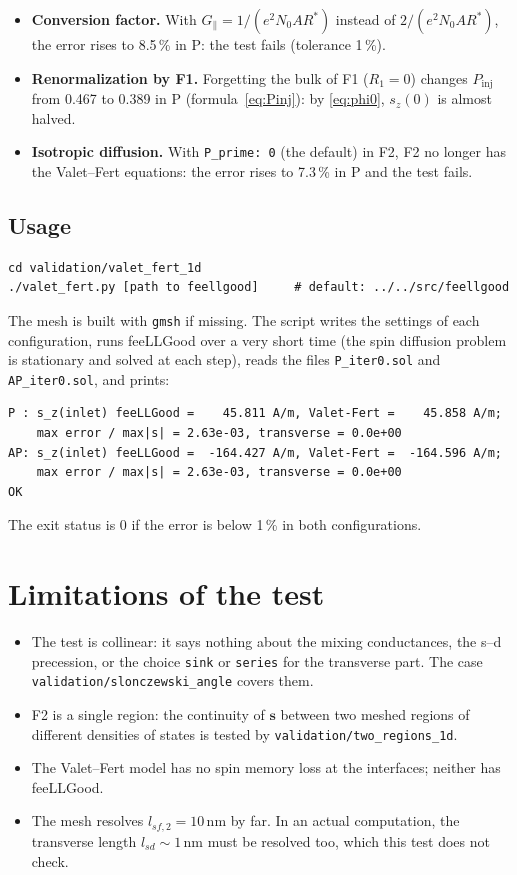 \documentclass[11pt,a4paper]{article}
\newcommand{\vs}{\bm{s}}
\begin{document}
\begin{itemize}
  \item \textbf{Conversion factor.} With $G_\parallel = 1/(e^2N_0AR^*)$
    instead of $2/(e^2N_0AR^*)$, the error rises to 8.5\,\% in P: the test
    fails (tolerance 1\,\%).
  \item \textbf{Renormalization by F1.} Forgetting the bulk of F1
    ($R_1 = 0$) changes $P_{\mathrm{inj}}$ from 0.467 to 0.389 in P
    (formula~\eqref{eq:Pinj}): by \eqref{eq:phi0}, $s_z(0)$ is almost
    halved.
  \item \textbf{Isotropic diffusion.} With \texttt{P\_prime: 0} (the
    default) in F2, F2 no longer has the Valet--Fert equations: the error
    rises to 7.3\,\% in P and the test fails.
\end{itemize}

\subsection{Usage}

\begin{verbatim}
cd validation/valet_fert_1d
./valet_fert.py [path to feellgood]     # default: ../../src/feellgood
\end{verbatim}
The mesh is built with \texttt{gmsh} if missing. The script writes the
settings of each configuration, runs feeLLGood over a very short time (the
spin diffusion problem is stationary and solved at each step), reads the
files \texttt{P\_iter0.sol} and \texttt{AP\_iter0.sol}, and prints:
\begin{verbatim}
P : s_z(inlet) feeLLGood =    45.811 A/m, Valet-Fert =    45.858 A/m;
    max error / max|s| = 2.63e-03, transverse = 0.0e+00
AP: s_z(inlet) feeLLGood =  -164.427 A/m, Valet-Fert =  -164.596 A/m;
    max error / max|s| = 2.63e-03, transverse = 0.0e+00
OK
\end{verbatim}
The exit status is 0 if the error is below 1\,\% in both configurations.

\section{Limitations of the test}

\begin{itemize}
  \item The test is collinear: it says nothing about the mixing
    conductances, the s--d precession, or the choice \texttt{sink} or
    \texttt{series} for the transverse part. The case
    \texttt{validation/slonczewski\_angle} covers them.
  \item F2 is a single region: the continuity of $\vs$ between two meshed
    regions of different densities of states is tested by
    \texttt{validation/two\_regions\_1d}.
  \item The Valet--Fert model has no spin memory loss at the interfaces;
    neither has feeLLGood.
  \item The mesh resolves $l_{sf,2} = 10$\,nm by far. In an actual
    computation, the transverse length $l_{sd}\sim1$\,nm must be resolved
    too, which this test does not check.
\end{itemize}
\end{document}
